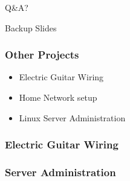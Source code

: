 \documentclass[aspectratio=169]{beamer}
\begin{document}
\begin{frame}
\Huge{\centerline{Q\&A?}}
\end{frame}


\begin{frame}
\Huge{\centerline{Backup Slides}}
\end{frame}

\begin{frame}
  \frametitle{Other Projects}
  \begin{itemize}
  \item Electric Guitar Wiring
  \item Home Network setup
  \item Linux Server Administration
  \end{itemize}
  
\end{frame}

\begin{frame}
  \frametitle{Electric Guitar Wiring}
\end{frame}

\begin{frame}
\frametitle{Server Administration}
\end{frame}
\end{document}
